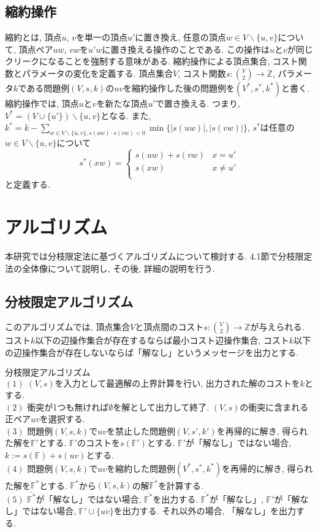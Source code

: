 \documentclass[10pt,a4j,twocolumn, dvipdfmx]{bxjsarticle}
\begin{document}
\subsection{縮約操作}
$\textbf{縮約}$とは, 頂点$u$, $v$を単一の頂点$u'$に置き換え, 任意の頂点$w \in V \backslash \{u,v\}$について, 頂点ペア$uw$, $vw$を$u'w$に置き換える操作のことである.
この操作は$u$と$v$が同じクリークになることを強制する意味がある.
縮約操作による頂点集合, コスト関数とパラメータの変化を定義する.
頂点集合$V$, コスト関数$s:\binom{V}{2} \rightarrow \mathbb{Z}$, パラメータ$k$である問題例$(V,s,k)$の$uv$を縮約操作した後の問題例を$(V^*,s^*,k^*)$と書く.
縮約操作では, 頂点$u$と$v$を新たな頂点$u'$で置き換える.
つまり, $V^*=(V \cup \{u'\}) \backslash \{u,v\}$となる.
また, $k^*= k - \sum_{w \in V \backslash \{u,v\},s(uw)\cdot s(vw) < 0} \min\{|s(uw)|, |s(vw)|\}$, $s^*$は任意の$w \in V \backslash \{u,v\}$について
\[s^*(xw)=
\left\{
    \begin{array}{ll}
        s(uw)+s(vw) & {x=u'}\\
        s(xw) & {x \neq u'}\\
    \end{array}
    \right.
\]
と定義する.\par

\section{アルゴリズム}
本研究では分枝限定法に基づくアルゴリズムについて検討する.
4.1節で分枝限定法の全体像について説明し, その後, 詳細の説明を行う.


\subsection{分枝限定アルゴリズム}
このアルゴリズムでは, 頂点集合$V$と頂点間のコスト$s:\binom{V}{2}\rightarrow\mathbb{Z}$が与えられる.
コスト$k$以下の辺操作集合が存在するならば最小コスト辺操作集合, コスト$k$以下の辺操作集合が存在しないならば「解なし」というメッセージを出力とする.
\begin{screen}
    $\textbf{分枝限定アルゴリズム}$ \\
    $(1)$ $(V,s)$を入力として最適解の上界計算を行い, 出力された解のコストを$k$とする.\\
    $(2)$ 衝突が1つも無ければ$\emptyset$を解として出力して終了. $(V,s)$の衝突に含まれる正ペア$uv$を選択する.\\
    $(3)$ 問題例$(V,s,k)$で$uv$を禁止した問題例$(V,s',k')$を再帰的に解き, 得られた解を$\mathbb{F'}$とする.
    $\mathbb{F'}$のコストを$s(\mathbb{F'})$とする. $\mathbb{F'}$が「解なし」ではない場合, $k:=s(\mathbb{F})+s(uv)$とする.\\
    $(4)$ 問題例$(V,s,k)$で$uv$を縮約した問題例$(V^*,s^*,k^*)$を再帰的に解き, 得られた解を$\mathbb{F^*}$とする. $\mathbb{F^*}$から$(V,s,k)$の解$\overline{\mathbb{F}^*}$を計算する.\\
    $(5)$ $\overline{\mathbb{F^*}}$が「解なし」ではない場合, $\overline{\mathbb{F^*}}$を出力する.
    $\overline{\mathbb{F^*}}$が「解なし」, $\mathbb{F'}$が「解なし」ではない場合, $\mathbb{F'}\cup \{uv\}$を出力する.
    それ以外の場合, 「解なし」を出力する.
\end{screen}
\end{document}
